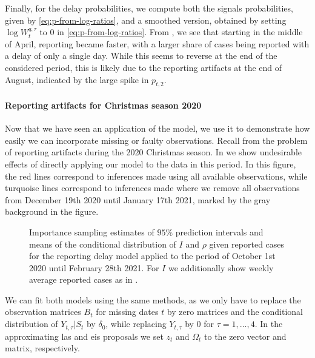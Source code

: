 Finally, for the delay probabilities, we compute both the signals probabilities, given by \eqref{eq:p-from-log-ratios}, and a smoothed version, obtained by setting $\log W_{t}^{q,\tau}$ to $0$ in \eqref{eq:p-from-log-ratios}. From , we see that starting in the middle of April, reporting became faster, with a larger share of cases being reported with a delay of only a single day. While this seems to reverse at the end of the considered period, this is likely due to the reporting artifacts at the end of August, indicated by the large spike in $p_{t,2}$. 

\paragraph{Reporting artifacts for Christmas season 2020}
Now that we have seen an application of the model, we use it to demonstrate how easily we can incorporate missing or faulty observations. Recall from  the problem of reporting artifacts during the 2020 Christmas season. In  we show undesirable effects of directly applying our model to the data in this period. In this figure, the red lines correspond to inferences made using all available observations, while turquoise lines correspond to inferences made where we remove all observations from December 19th 2020 until January 17th 2021, marked by the gray background in the figure. 
\begin{figure}
    \resizebox{\textwidth}{!}{%
    }
    \caption{Importance sampling estimates of $95\%$ prediction intervals and means of the conditional distribution of $I$ and $\rho$ given reported cases for the reporting delay model applied to the period of October 1st 2020 until February 28th 2021. For $I$ we additionally show weekly average reported cases as in . }
    \label{fig:christmas_prediction_intervals_I_rho}
\end{figure}

We can fit both models using the same methods, as we only have to replace the observation matrices $B_{t}$ for missing dates $t$ by zero matrices and the conditional distribution of $Y_{t, \tau} | S_{t}$ by $\delta_{0}$, while replacing $Y_{t,\tau}$ by $0$ for $\tau = 1, \dots, 4$. In the approximating \glspl{la} and \gls{eis} proposals we set $z_{t}$ and $\Omega_{t}$ to the zero vector and matrix, respectively. 

